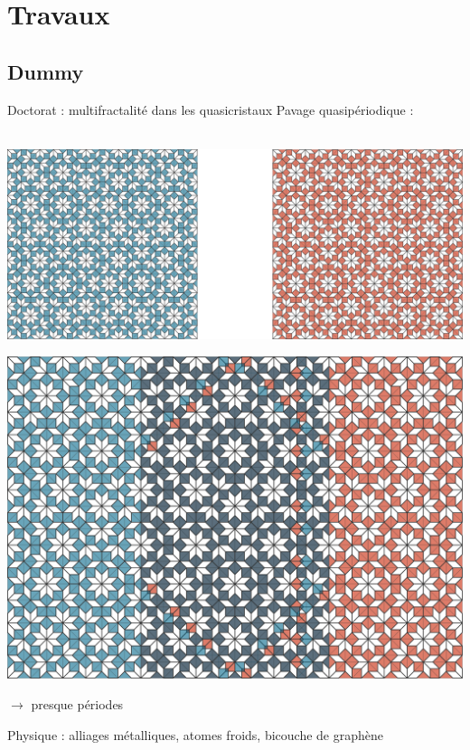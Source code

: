 \section{Travaux}
\subsection{Dummy}
\begin{frame}{Doctorat : multifractalité dans les quasicristaux}
\centering
Pavage quasipériodique :
~\\
~\\
{
\includegraphics[height=0.6\textheight]{img/1_travaux/no_overlap}

\phantom{presque périodique}

\phantom{Physique : alliages métalliques, atomes froids, bicouche de graphène}
}
{
\includegraphics[height=0.6\textheight]{img/1_travaux/overlap}

$\to$ presque périodes

Physique : alliages métalliques, atomes froids, bicouche de graphène
}
\end{frame}

